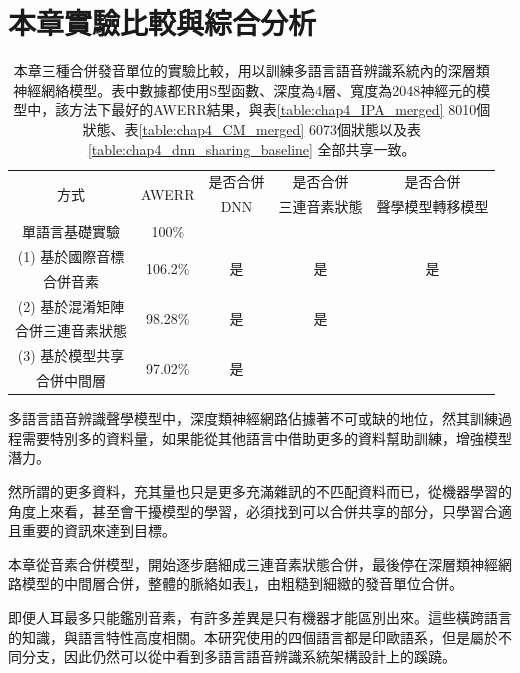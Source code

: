 \section{本章實驗比較與綜合分析}
\begin{table}[]
\centering
\begin{tabular}{|c|c|c|c|c|}
\hline
\multirow{2}{*}{方式} & \multirow{2}{*}{AWERR}    & 是否合併& 是否合併             & 是否合併 \\
     & & DNN  & 三連音素狀態 &  聲學模型轉移模型 \\
\hline
單語言基礎實驗  & 100\% &  &  &   \\
\hline
(1) 基於國際音標 & \multirow{2}{*}{106.2\% } & \multirow{2}{*}{ 是 } & \multirow{2}{*}{是}  & \multirow{2}{*}{是}  \\
合併音素& & & & \\
\hline
(2) 基於混淆矩陣 & \multirow{2}{*}{ 98.28\%} & \multirow{2}{*}{ 是 } & \multirow{2}{*}{是}  &  \\
合併三連音素狀態& & & & \\
\hline
(3) 基於模型共享 & \multirow{2}{*}{97.02\%} &\multirow{2}{*}{ 是 } &  &  \\
合併中間層 & & & & \\
\hline
\end{tabular}
\caption{本章三種合併發音單位的實驗比較，用以訓練多語言語音辨識系統內的深層類神經網絡模型。表中數據都使用S型函數、深度為4層、寬度為2048神經元的模型中，該方法下最好的AWERR結果，與表\ref{table:chap4_IPA_merged} 8010個狀態、表\ref{table:chap4_CM_merged} 6073個狀態以及表\ref{table:chap4_dnn_sharing_baseline} 全部共享一致。}
\label{table:chap4_merging_illustrator}
\end{table}
多語言語音辨識聲學模型中，深度類神經網路佔據著不可或缺的地位，然其訓練過程需要特別多的資料量，如果能從其他語言中借助更多的資料幫助訓練，增強模型潛力。

然所謂的更多資料，充其量也只是更多充滿雜訊的不匹配資料而已，從機器學習的角度上來看，甚至會干擾模型的學習，必須找到可以合併共享的部分，只學習合適且重要的資訊來達到目標。

本章從音素合併模型，開始逐步磨細成三連音素狀態合併，最後停在深層類神經網路模型的中間層合併，整體的脈絡如表\ref{table:chap4_merging_illustrator}，由粗糙到細緻的發音單位合併。

即便人耳最多只能鑑別音素，有許多差異是只有機器才能區別出來。這些橫跨語言的知識，與語言特性高度相關。本研究使用的四個語言都是印歐語系，但是屬於不同分支，因此仍然可以從中看到多語言語音辨識系統架構設計上的蹊蹺。
